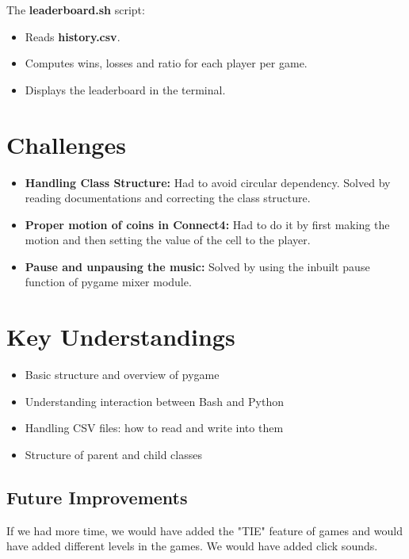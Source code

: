 \documentclass{article}
\begin{document}
The \textbf{leaderboard.sh} script:
\begin{itemize}
    \item Reads \textbf{history.csv}.
    \item Computes wins, losses and ratio for each player per game.
    \item Displays the leaderboard in the terminal.
\end{itemize}


\section{Challenges}
\begin{itemize}
    \item \textbf{Handling Class Structure:} Had to avoid circular dependency. Solved by reading documentations and correcting the class structure.
    \item \textbf{Proper motion of coins in Connect4:} Had to do it by first making the motion and then setting the value of the cell to the player.
    \item \textbf{Pause and unpausing the music:} Solved by using the inbuilt pause function of pygame mixer module.
\end{itemize}

\section{Key Understandings}
\begin{itemize}
    \item Basic structure and overview of pygame
    \item Understanding interaction between Bash and Python
    \item Handling CSV files: how to read and write into them
    \item Structure of parent and child classes
\end{itemize}

\subsection{Future Improvements}
If we had more time, we would have added the "TIE" feature of games and would have added different levels in the games. We would have added click sounds.
\end{document}
